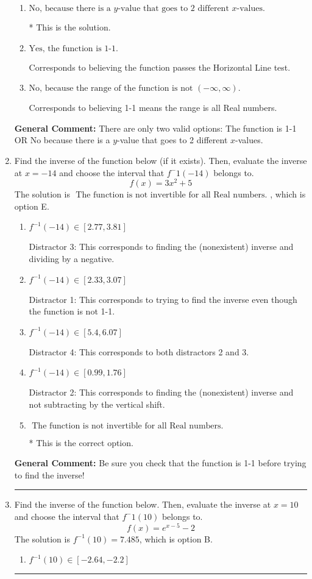 \documentclass{extbook}[14pt]
\newcommand{\litem}[1]{\item #1

\rule{\textwidth}{0.4pt}}
\begin{document}
\begin{enumerate}
{\begin{enumerate}[label=\Alph*.]
Corresponds to the Vertical Line test, which checks if an expression is a function.
\item \( \text{No, because there is a $y$-value that goes to 2 different $x$-values.} \)

* This is the solution.
\item \( \text{Yes, the function is 1-1.} \)

Corresponds to believing the function passes the Horizontal Line test.
\item \( \text{No, because the range of the function is not $(-\infty, \infty)$.} \)

Corresponds to believing 1-1 means the range is all Real numbers.
\end{enumerate}

\textbf{General Comment:} There are only two valid options: The function is 1-1 OR No because there is a $y$-value that goes to 2 different $x$-values.
}
\litem{
Find the inverse of the function below (if it exists). Then, evaluate the inverse at $x = -14$ and choose the interval that $f^-1(-14)$ belongs to.
\[ f(x) = 3 x^2 + 5 \]The solution is \( \text{ The function is not invertible for all Real numbers. } \), which is option E.\begin{enumerate}[label=\Alph*.]
\item \( f^{-1}(-14) \in [2.77, 3.81] \)

 Distractor 3: This corresponds to finding the (nonexistent) inverse and dividing by a negative.
\item \( f^{-1}(-14) \in [2.33, 3.07] \)

 Distractor 1: This corresponds to trying to find the inverse even though the function is not 1-1. 
\item \( f^{-1}(-14) \in [5.4, 6.07] \)

 Distractor 4: This corresponds to both distractors 2 and 3.
\item \( f^{-1}(-14) \in [0.99, 1.76] \)

 Distractor 2: This corresponds to finding the (nonexistent) inverse and not subtracting by the vertical shift.
\item \( \text{ The function is not invertible for all Real numbers. } \)

* This is the correct option.
\end{enumerate}

\textbf{General Comment:} Be sure you check that the function is 1-1 before trying to find the inverse!
}
\litem{
Find the inverse of the function below. Then, evaluate the inverse at $x = 10$ and choose the interval that $f^-1(10)$ belongs to.
\[ f(x) = e^{x-5}-2 \]The solution is \( f^{-1}(10) = 7.485 \), which is option B.\begin{enumerate}[label=\Alph*.]
\item \( f^{-1}(10) \in [-2.64, -2.2] \)


\end{enumerate}}
\end{enumerate}
\end{document}
